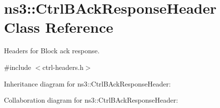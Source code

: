 \hypertarget{classns3_1_1CtrlBAckResponseHeader}{}\section{ns3\+:\+:Ctrl\+B\+Ack\+Response\+Header Class Reference}
\label{classns3_1_1CtrlBAckResponseHeader}


Headers for Block ack response.  




{\ttfamily \#include $<$ctrl-\/headers.\+h$>$}



Inheritance diagram for ns3\+:\+:Ctrl\+B\+Ack\+Response\+Header\+:


Collaboration diagram for ns3\+:\+:Ctrl\+B\+Ack\+Response\+Header\+:
